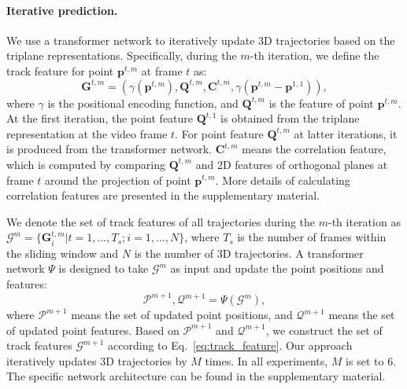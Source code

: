 \paragraph{Iterative prediction.}
We use a transformer network to iteratively update 3D trajectories based on the triplane representations.
Specifically, during the $m$-th iteration, we define the track feature for point $\mathbf{p}^{t, m}$ at frame $t$ as:
\begin{equation}
    \mathbf{G}^{t, m} = (\gamma(\mathbf{p}^{t, m}), \mathbf{Q}^{t, m}, \mathbf{C}^{t, m}, \gamma(\mathbf{p}^{t, m} - \mathbf{p}^{1, 1})),
    \label{eq:track_feature}
\end{equation}
where $\gamma$ is the positional encoding function, and $\mathbf{Q}^{t, m}$ is the feature of point $\mathbf{p}^{t, m}$.
At the first iteration, the point feature $\mathbf{Q}^{t, 1}$ is obtained from the triplane representation at the video frame $t$.
For point feature $\mathbf{Q}^{t, m}$ at latter iterations, it is produced from the transformer network.
$\mathbf{C}^{t, m}$ means the correlation feature, which is computed by comparing $\mathbf{Q}^{t, m}$ and 2D features of orthogonal planes at frame $t$ around the projection of point $\mathbf{p}^{t, m}$.
More details of calculating correlation features are presented in the supplementary material.

\label{para:motionToken}

We denote the set of track features of all trajectories during the $m$-th iteration as $\mathcal{G}^{m} = \{\mathbf{G}_i^{t, m} | t=1, ..., T_s; i=1, ..., N\}$, where $T_s$ is the number of frames within the sliding window and $N$ is the number of 3D trajectories.
A transformer network $\Psi$ is designed to take $\mathcal{G}^m$ as input and update the point positions and features:
\begin{equation}
    \mathcal{P}^{m+1}, \mathcal{Q}^{m+1} = \Psi(\mathcal{G}^m), 
\end{equation}
where $\mathcal{P}^{m+1}$ means the set of updated point positions, and $\mathcal{Q}^{m+1}$ means the set of updated point features.
Based on $\mathcal{P}^{m+1}$ and $\mathcal{Q}^{m+1}$, we construct the set of track features $\mathcal{G}^{m+1}$ according to Eq.~\eqref{eq:track_feature}.
Our approach iteratively updates 3D trajectories by $M$ times.
In all experiments, $M$ is set to 6.
The specific network architecture can be found in the supplementary material.


